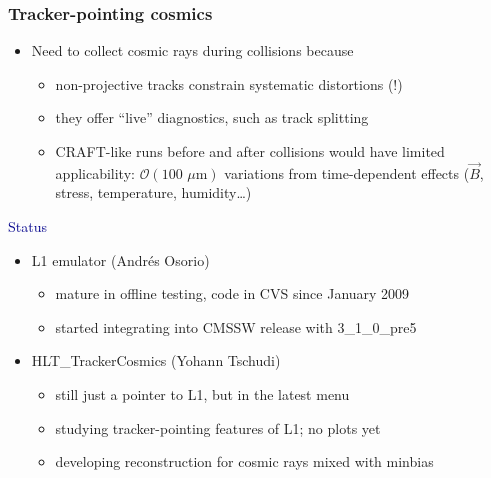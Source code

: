 \documentclass[compress]{beamer}
\begin{document}
\begin{frame}
\frametitle{Tracker-pointing cosmics}

\begin{itemize}
\item Need to collect cosmic rays during collisions because
\begin{itemize}\setlength{\itemsep}{0.1 cm}
\item non-projective tracks constrain systematic distortions (!)
\item they offer ``live'' diagnostics, such as track splitting
\item CRAFT-like runs before and after collisions would have limited
  applicability: $\mathcal{O}(\mbox{100~$\mu$m})$ variations from
  time-dependent effects ($\vec{B}$, stress, temperature,
  humidity\ldots)
\end{itemize}
\end{itemize}

\hspace{-0.83 cm} \textcolor{darkblue}{\Large Status}

\begin{itemize}\setlength{\itemsep}{0.25 cm}
\item L1 emulator (Andr\'es Osorio)
\begin{itemize}\setlength{\itemsep}{0.1 cm}
\item mature in offline testing, code in CVS since January 2009
\item started integrating into CMSSW release with 3\_1\_0\_pre5
\end{itemize}

\item HLT\_TrackerCosmics (Yohann Tschudi)
\begin{itemize}\setlength{\itemsep}{0.1 cm}
\item still just a pointer to L1, but in the latest menu
\item studying tracker-pointing features of L1; no plots yet
\item developing reconstruction for cosmic rays mixed with minbias
\end{itemize}
\end{itemize}

\end{frame}
\end{document}
